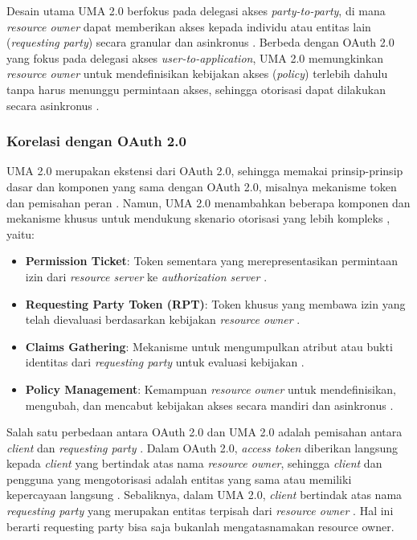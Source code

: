 Desain utama UMA 2.0 berfokus pada delegasi akses \textit{party-to-party}, di mana \textit{resource owner} dapat memberikan akses kepada individu atau entitas lain (\textit{requesting party}) secara granular dan asinkronus \autocite{umaspec}.
Berbeda dengan OAuth 2.0 yang fokus pada delegasi akses \textit{user-to-application}, UMA 2.0 memungkinkan \textit{resource owner} untuk mendefinisikan kebijakan akses (\textit{policy}) terlebih dahulu tanpa harus menunggu permintaan akses, sehingga otorisasi dapat dilakukan secara asinkronus \autocite{jaimeauthorizationmodels}.

\subsubsection{Korelasi dengan OAuth 2.0}

UMA 2.0 merupakan ekstensi dari OAuth 2.0, sehingga memakai prinsip-prinsip dasar dan komponen yang sama dengan OAuth 2.0, misalnya mekanisme token dan pemisahan peran \autocite{umaspec}.
Namun, UMA 2.0 menambahkan beberapa komponen dan mekanisme khusus untuk mendukung skenario otorisasi yang lebih kompleks \autocite{jaimeauthorizationmodels}, yaitu:

\begin{itemize}
    \item \textbf{Permission Ticket}: Token sementara yang merepresentasikan permintaan izin dari \textit{resource server} ke \textit{authorization server} \autocite{umaspec}.
    \item \textbf{Requesting Party Token (RPT)}: Token khusus yang membawa izin yang telah dievaluasi berdasarkan kebijakan \textit{resource owner} \autocite{umaspec}.
    \item \textbf{Claims Gathering}: Mekanisme untuk mengumpulkan atribut atau bukti identitas dari \textit{requesting party} untuk evaluasi kebijakan \autocite{umaspec}.
    \item \textbf{Policy Management}: Kemampuan \textit{resource owner} untuk mendefinisikan, mengubah, dan mencabut kebijakan akses secara mandiri dan asinkronus \autocite{jaimeauthorizationmodels}.
\end{itemize}

Salah satu perbedaan antara OAuth 2.0 dan UMA 2.0 adalah pemisahan antara \textit{client} dan \textit{requesting party} \autocite{umaspec}.
Dalam OAuth 2.0, \textit{access token} diberikan langsung kepada \textit{client} yang bertindak atas nama \textit{resource owner}, sehingga \textit{client} dan pengguna yang mengotorisasi adalah entitas yang sama atau memiliki kepercayaan langsung \autocite{oauthspec}.
Sebaliknya, dalam UMA 2.0, \textit{client} bertindak atas nama \textit{requesting party} yang merupakan entitas terpisah dari \textit{resource owner} \autocite{umaspec}.
Hal ini berarti requesting party bisa saja bukanlah mengatasnamakan resource owner.

